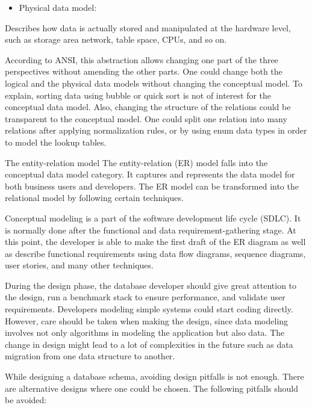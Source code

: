 \documentclass[]{book}
\providecommand{\tightlist}{%
  \setlength{\itemsep}{0pt}\setlength{\parskip}{0pt}}
\begin{document}
\begin{itemize}
\tightlist
\item
  Physical data model:
\end{itemize}

Describes how data is actually stored and manipulated at the hardware level, such as storage area network, table space, CPUs, and so on.

According to ANSI, this abstraction allows changing one part of the three perspectives without amending the other parts. One could change both the logical and the physical data models without changing the conceptual model. To explain, sorting data using bubble or quick sort is not of interest for the conceptual data model. Also, changing the structure of the relations could be transparent to the conceptual model. One could split one relation into many relations after applying normalization rules, or by using enum data types in order to model the lookup tables.

The entity-relation model
The entity-relation (ER) model falls into the conceptual data model category. It captures and represents the data model for both business users and developers. The ER model can be transformed into the relational model by following certain techniques.

Conceptual modeling is a part of the software development life cycle (SDLC). It is normally done after the functional and data requirement-gathering stage. At this point, the developer is able to make the first draft of the ER diagram as well as describe functional requirements using data flow diagrams, sequence diagrams, user stories, and many other techniques.

During the design phase, the database developer should give great attention to the design, run a benchmark stack to ensure performance, and validate user requirements. Developers modeling simple systems could start coding directly. However, care should be taken when making the design, since data modeling involves not only algorithms in modeling the application but also data. The change in design might lead to a lot of complexities in the future such as data migration from one data structure to another.

While designing a database schema, avoiding design pitfalls is not enough. There are alternative designs where one could be chosen. The following pitfalls should be avoided:
\end{document}
